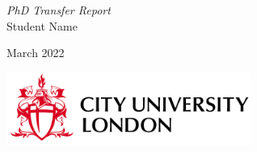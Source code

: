 \documentclass[paper=a4, fontsize=13pt, oneside, openany]{scrartcl} %
\numberwithin{equation}{section} %
\numberwithin{figure}{section} %
\numberwithin{table}{section} %
\begin{document}
\begin{titlepage}
\begin{center}
        \vspace*{3cm}

        \Huge
        \textit{PhD Transfer Report}\\[15pt]
 
        \vspace{0.5cm}
        \LARGE
        Student Name
 
        \vspace{0.2cm}
        \normalfont\Large
        March 2022
        
        \vspace{9.5cm}
 
        \includegraphics[width=0.6\textwidth]{Images/city-logo.png}
 
 
    \end{center}
\end{titlepage}


\newpage
\tableofcontents











%








%



%
%
\end{document}
